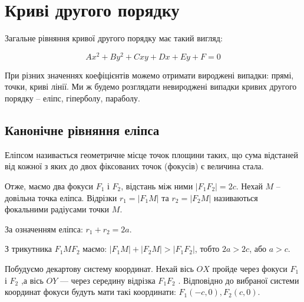 \chapter{Криві другого порядку}

Загальне рівняння кривої другого порядку має такий вигляд:

$$Ax^2 + By^2 + Cxy + Dx + Ey + F = 0$$

При різних значеннях коефіцієнтів можемо отримати вироджені випадки:
прямі, точки, криві лінії. Ми ж будемо розглядати невироджені випадки кривих
другого порядку – еліпс, гіперболу, параболу. 

\section{Канонічне рівняння еліпса}

\begin{definition}
	Еліпсом називається геометричне місце точок площини таких, що сума
	відстаней від кожної з яких до двох фіксованих точок (фокусів) є величина стала. 
\end{definition}

\parbox{4cm}{}
\parbox{8cm}{
	Отже, маємо два фокуси $F_1$ і $F_2$, відстань між ними $|F_1F_2| = 2c$. Нехай $M$ – довільна точка
	еліпса. Відрізки $r_1 = |F_1M|$ та $r_2 = |F_2M|$
	називаються фокальними радіусами точки $M$.

	За означенням еліпса: $r_1 + r_2 = 2a$.
}

З трикутника $F_1MF_2$ маємо: $|F_1M| + |F_2M| > |F_1F_2|$, тобто $2a > 2c$, або $a>c$.

\parbox{6cm}{}
\parbox{6cm}{
	Побудуємо декартову систему
	координат. Нехай вісь $OX$
	пройде через фокуси $F_1$ і $F_2$ ,а
	вісь $OY$ --- через середину
	відрізка $F_1F_2$ . Відповідно до
	вибраної системи координат
	фокуси будуть мати такі
	координати: $F_1(-c,0), F_2(c,0)$. 
}

